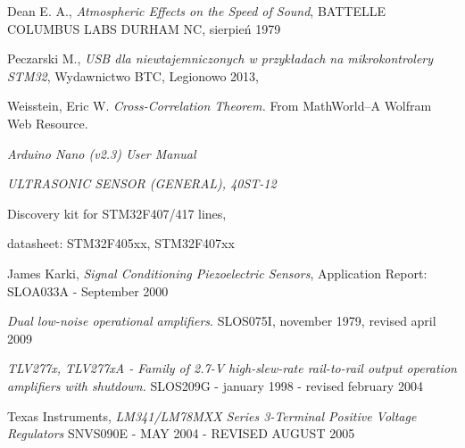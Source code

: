 \begin{thebibliography}{99}


    Dean E. A., \textit{Atmospheric Effects on the Speed of Sound}, BATTELLE COLUMBUS LABS DURHAM NC, sierpień 1979

   Peczarski M., 
  \textit{USB dla niewtajemniczonych w przykładach na mikrokontrolery STM32}, Wydawnictwo BTC, Legionowo 2013,

   Weisstein, Eric W. \textit{Cross-Correlation Theorem.} From MathWorld--A Wolfram Web Resource. 

  \textit{Arduino Nano (v2.3) User Manual}
  
  \textit{ULTRASONIC SENSOR (GENERAL), 40ST-12}

   Discovery kit for STM32F407/417 lines,

   datasheet: STM32F405xx, STM32F407xx 
  
   James Karki, \textit{Signal Conditioning Piezoelectric Sensors}, 
  Application Report: SLOA033A - September 2000

   \textit{Dual low-noise operational amplifiers}. SLOS075I, november 1979, revised april 2009

   \textit{TLV277x, TLV277xA - Family of 2.7-V high-slew-rate rail-to-rail output operation amplifiers with shutdown.}
  SLOS209G - january 1998 - revised february 2004
  
   Texas Instruments, \textit{LM341/LM78MXX Series 3-Terminal Positive Voltage Regulators}
  SNVS090E - MAY 2004 - REVISED AUGUST 2005
  


\end{thebibliography}
